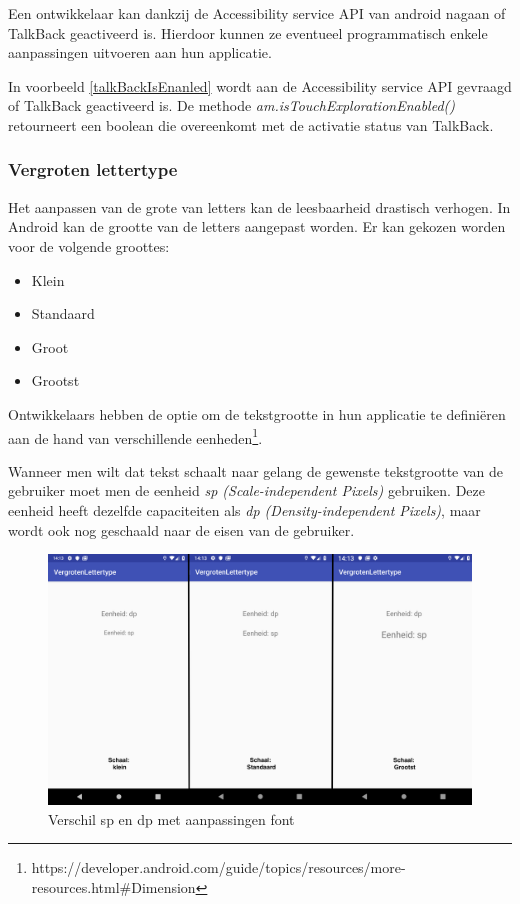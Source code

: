 Een ontwikkelaar kan dankzij de Accessibility service API van android nagaan of TalkBack geactiveerd is. Hierdoor kunnen ze eventueel programmatisch enkele aanpassingen uitvoeren aan hun applicatie.


In voorbeeld \ref{talkBackIsEnanled} wordt aan de Accessibility service \gls{API} gevraagd of TalkBack geactiveerd is. De methode \emph{am.isTouchExplorationEnabled()} retourneert een boolean die overeenkomt met de activatie status van TalkBack.


\subsubsection{Vergroten lettertype}
Het aanpassen van de grote van letters kan de leesbaarheid drastisch verhogen. In Android kan de grootte van de letters aangepast worden.
Er kan gekozen worden voor de volgende groottes:
\begin{itemize}
    \item Klein
    \item Standaard
    \item Groot
    \item Grootst
\end{itemize}

Ontwikkelaars hebben de optie om de tekstgrootte in hun applicatie te definiëren aan de hand van verschillende eenheden\footnote{https://developer.android.com/guide/topics/resources/more-resources.html\#Dimension}.

Wanneer men wilt dat tekst schaalt naar gelang de gewenste tekstgrootte van de gebruiker moet men de eenheid \emph{sp (Scale-independent Pixels)} gebruiken. Deze eenheid heeft dezelfde capaciteiten als \emph{dp (Density-independent Pixels)}, maar wordt ook nog geschaald naar de eisen van de gebruiker.
\begin{figure}[h!]
    \centering
    \includegraphics[width=0.8\linewidth]{img/Android_Scale_font}
    \caption{Verschil sp en dp met aanpassingen font}
    \label{fig:androidscalefont}
\end{figure}

